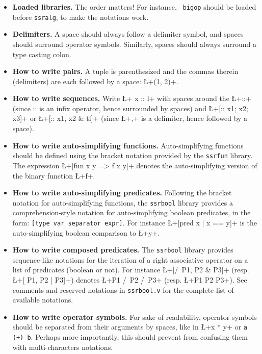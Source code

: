 \begin{itemize}
\item {\bf Loaded libraries.} The order matters! For instance, {\tt
    bigop} should be loaded before {\tt ssralg}, to make the
  notations work.

\item {\bf Delimiters.} A space should always follow a delimiter
  symbol, and spaces should surround operator symbols. Similarly,
  spaces should always surround a type casting colon.

\item {\bf How to write pairs.} A tuple is parenthesized and the
  commas therein (delimiters) are each followed by a space:
  \L+(1, 2)+.

\item {\bf How to write sequences.} Write \L+ x :: l+ with spaces around
  the \L+::+ (since :: is an infix operator, hence surrounded by
  spaces) and \L+[:: x1; x2; x3]+ or \L+[:: x1, x2 & tl]+ (since \L+,+
  is a delimiter, hence followed by a space).

\item  {\bf How to write auto-simplifying functions.} Auto-simplifying
  functions should be defined using the bracket notation provided by
  the \texttt{ssrfun} library. The expression \L+[fun x y => f x y]+
  denotes the auto-simplifying version of the binary function \L+f+.

\item {\bf How to write auto-simplifying predicates.} Following the
  bracket notation for auto-simplifying functions, the \texttt{ssrbool}
  library provides a
  comprehension-style notation for auto-simplifying boolean predicates,
  in the form: \texttt{[type var separator expr]}. For instance
  \L+[pred x | x == y]+ is the auto-simplifying boolean comparison to \L+y+.


\item {\bf How to write composed predicates.} The \texttt{ssrbool}
  library
  provides sequence-like notations for the
  iteration of a right associative operator on a list of
  predicates (boolean or not).
  For instance \L+[/\ P1, P2 & P3]+ (resp. \L+[\/ P1, P2 | P3]+)
  denotes \L+P1 /\ P2 /\ P3+ (resp. \L+P1 \/ P2 \/ P3+). See comments
  and reserved notations in \texttt{ssrbool.v} for the complete list of
   available notations.


\item {\bf How to write operator symbols.} For sake of readability,
  operator symbols should
  be separated from their arguments by spaces, like in \L+x * y+ or
  \texttt{a (+)  b}.
  Perhaps more importantly,  this should prevent
  \Coq{} from confusing them with multi-characters notations.


\end{itemize}
